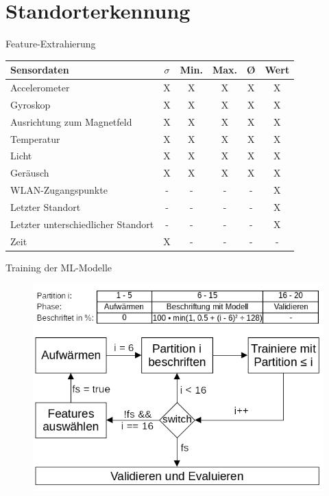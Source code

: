 \documentclass[10pt]{beamer}
\begin{document}
\section{Standorterkennung}
\begin{frame}{Feature-Extrahierung}
    \begin{table}
        \centering
        \begin{tabular}{ | l | c | c | c | c | c | }
            \hline
            Sensordaten & $\sigma$ & Min. & Max. & Ø & Wert \\\hline
            Accelerometer & X & X & X & X & X \\\hline
            Gyroskop & X & X & X & X & X \\\hline
            Ausrichtung zum Magnetfeld & X & X & X & X & X \\\hline
            Temperatur & X & X & X & X & X \\\hline
            Licht & X & X & X & X & X \\\hline
            Geräusch & X & X & X & X & X \\\hline
            WLAN-Zugangspunkte & - & - & - & - & X \\\hline
            Letzter Standort & - & - & - & - & X \\\hline
            Letzter unterschiedlicher Standort & - & - & - & - & X \\\hline
            Zeit & X & - & - & - & - \\\hline
        \end{tabular}
    \end{table}
\end{frame}

\begin{frame}{Training der ML-Modelle}
    \begin{figure}
        \centering
        \includegraphics[width=\linewidth]{model/training_explained.png}
    \end{figure}
\end{frame}
\end{document}
